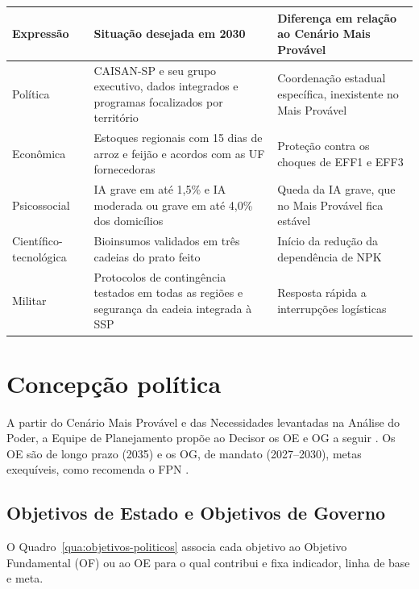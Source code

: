 \documentclass[
	12pt,				%
	openright,			%
	oneside,			%
	a4paper,			%
	chapter=TITLE,		%
	section=TITLE,		%
	english,			%
	french,				%
	spanish,			%
	brazil,				%
 ]{abntex2}
\begin{document}
\begin{quadro}[!htbp]
\centering
\caption{Cenário Desejado 2030 por Expressão do Poder Nacional}
\label{qua:cenario-desejado}
\footnotesize
\renewcommand{\arraystretch}{1.05}
\setlength{\tabcolsep}{3pt}
\begin{tabularx}{\textwidth}{|>{\raggedright\arraybackslash}p{2.8cm}|>{\raggedright\arraybackslash}X|>{\raggedright\arraybackslash}p{3.6cm}|}
\hline
\textbf{Expressão} & \textbf{Situação desejada em 2030} & \textbf{Diferença em relação ao Cenário Mais Provável} \\
\hline
Política & CAISAN-SP e seu grupo executivo, dados integrados e programas focalizados por território & Coordenação estadual específica, inexistente no Mais Provável \\
\hline
Econômica & Estoques regionais com 15 dias de arroz e feijão e acordos com as UF fornecedoras & Proteção contra os choques de EFF1 e EFF3 \\
\hline
Psicossocial & IA grave em até 1,5\% e IA moderada ou grave em até 4,0\% dos domicílios & Queda da IA grave, que no Mais Provável fica estável \\
\hline
Científico-tecnológica & Bioinsumos validados em três cadeias do prato feito & Início da redução da dependência de NPK \\
\hline
Militar & Protocolos de contingência testados em todas as regiões e segurança da cadeia integrada à SSP & Resposta rápida a interrupções logísticas \\
\hline
\end{tabularx}
\end{quadro}

\section{Concepção política}
A partir do Cenário Mais Provável e das Necessidades levantadas na Análise do
Poder, a Equipe de Planejamento propõe ao Decisor os OE e OG a seguir
\cite[p. 105--106]{esg_mpe2026}. Os OE são de longo prazo (2035) e os OG, de
mandato (2027--2030), metas exequíveis, como recomenda o FPN
\cite[p. 41]{esg_fpn2024}.

\subsection{Objetivos de Estado e Objetivos de Governo}
O Quadro~\ref{qua:objetivos-politicos} associa cada objetivo ao Objetivo
Fundamental (OF) ou ao OE para o qual contribui e fixa indicador, linha de base e
meta.
\end{document}
